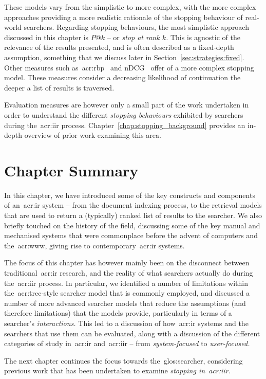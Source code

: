These models vary from the simplistic to more complex, with the more complex approaches providing a more realistic rationale of the stopping behaviour of real-world searchers. Regarding stopping behaviours, the most simplistic approach discussed in this chapter is $P@k$ -- or \emph{stop at rank $k$.} This is agnostic of the relevance of the results presented, and is often described as a fixed-depth assumption, something that we discuss later in Section~\ref{sec:strategies:fixed}. Other measures such as~\gls{acr:rbp}~\citep{moffat2008rbp} and nDCG~\citep{jarvelin2002cg} offer of a more complex stopping model. These measures consider a decreasing likelihood of continuation the deeper a list of results is traversed.

Evaluation measures are however only a small part of the work undertaken in order to understand the different \emph{stopping behaviours} exhibited by searchers during the~\gls{acr:iir} process. Chapter~\ref{chap:stopping_background} provides an in-depth overview of prior work examining this area.

\vspace*{-2mm}
\section{Chapter Summary}
In this chapter, we have introduced some of the key constructs and components of an~\gls{acr:ir} system -- from the document indexing process, to the retrieval models that are used to return a (typically) ranked list of results to the searcher. We also briefly touched on the history of the field, discussing some of the key manual and mechanised systems that were commonplace before the advent of computers and the~\gls{acr:www}, giving rise to contemporary~\gls{acr:ir} systems.

The focus of this chapter has however mainly been on the disconnect between traditional~\gls{acr:ir} research, and the reality of what searchers actually do during the~\gls{acr:iir} process. In particular, we identified a number of limitations within the~\gls{acr:trec}-style searcher model that is commonly employed, and discussed a number of more advanced searcher models that reduce the assumptions (and therefore limitations) that the models provide, particularly in terms of a searcher's \emph{interactions.} This led to a discussion of how~\gls{acr:ir} systems and the searchers that use them can be evaluated, along with a discussion of the different categories of study in~\gls{acr:ir} and~\gls{acr:iir} -- from \emph{system-focused} to \emph{user-focused.}

The next chapter continues the focus towards the~\gls{glos:searcher}, considering previous work that has been undertaken to examine \emph{stopping in~\gls{acr:iir}.}

\newpage
\thispagestyle{empty}
\mbox{}